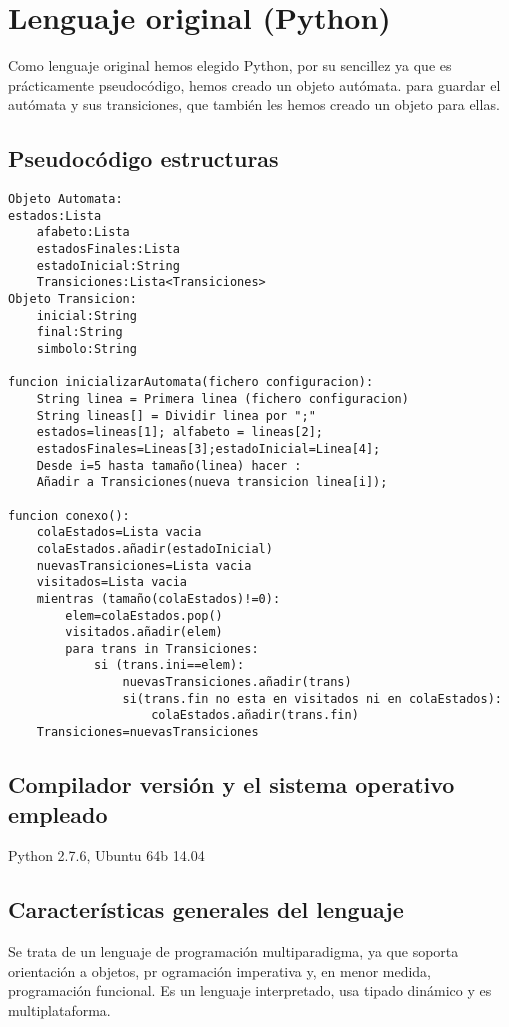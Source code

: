 \documentclass[12pt,a4paper]{article}
\begin{document}
\section{Lenguaje original (Python)}

Como lenguaje original hemos elegido Python, por su sencillez ya que es
prácticamente pseudocódigo, hemos creado un objeto autómata. para guardar el
autómata y sus transiciones, que también les hemos creado un objeto para ellas.


\subsection{Pseudocódigo estructuras}

\begin{lstlisting}
Objeto Automata:
estados:Lista
	afabeto:Lista
	estadosFinales:Lista
	estadoInicial:String
	Transiciones:Lista<Transiciones>
Objeto Transicion: 
	inicial:String
	final:String
	simbolo:String

funcion inicializarAutomata(fichero configuracion):
	String linea = Primera linea (fichero configuracion)
	String lineas[] = Dividir linea por ";"
	estados=lineas[1]; alfabeto = lineas[2];
	estadosFinales=Lineas[3];estadoInicial=Linea[4];
	Desde i=5 hasta tamaño(linea) hacer :
	Añadir a Transiciones(nueva transicion linea[i]);

funcion conexo():
	colaEstados=Lista vacia
	colaEstados.añadir(estadoInicial)
	nuevasTransiciones=Lista vacia
	visitados=Lista vacia
	mientras (tamaño(colaEstados)!=0):
		elem=colaEstados.pop()
		visitados.añadir(elem)
		para trans in Transiciones:
			si (trans.ini==elem):
				nuevasTransiciones.añadir(trans)
				si(trans.fin no esta en	visitados ni en colaEstados):
					colaEstados.añadir(trans.fin)
	Transiciones=nuevasTransiciones
\end{lstlisting}

\subsection{Compilador versión y el sistema operativo empleado}
Python 2.7.6, Ubuntu 64b 14.04


\subsection{Características generales del lenguaje}
  Se trata de un lenguaje de programación multiparadigma, ya que soporta orientación a objetos, pr																												ogramación imperativa y, en menor medida, programación funcional. Es un lenguaje interpretado, usa tipado dinámico y es multiplataforma.
\end{document}
